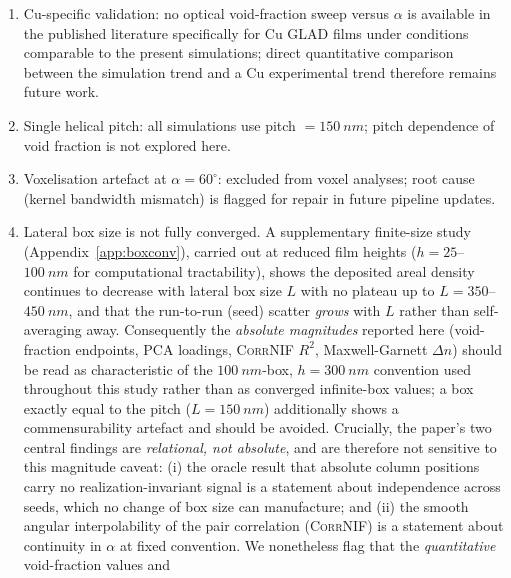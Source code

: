 \documentclass[aip,amsmath,amssymb,reprint]{revtex4-1}
\newcommand{\dang}{\ensuremath{\alpha}}
\begin{document}
\begin{enumerate}
    (An earlier watershed-estimator analysis of these same runs reported
    $\beta\approx81$--$82^{\circ}$ and a non-monotonic $\sigma$ dependence;
    as in the two preceding items, this is an artefact of that estimator on
    the dense box-$\SI{100}{nm}$ film and does not survive re-measurement.)
  \item Cu-specific validation: no optical void-fraction sweep versus $\dang$
    is available in the published literature specifically for Cu GLAD films
    under conditions comparable to the present simulations; direct quantitative
    comparison between the simulation trend and a Cu experimental trend
    therefore remains future work.
  \item Single helical pitch: all simulations use pitch $= \SI{150}{nm}$;
    pitch dependence of void fraction is not explored here.
  \item Voxelisation artefact at $\dang = 60^{\circ}$: excluded from voxel
    analyses; root cause (kernel bandwidth mismatch) is flagged for
    repair in future pipeline updates.
  \item Lateral box size is not fully converged. A supplementary finite-size
    study (Appendix~\ref{app:boxconv}), carried out at reduced film heights
    ($h = 25$--$\SI{100}{nm}$ for computational tractability), shows the
    deposited areal density continues to decrease with lateral box size $L$
    with no plateau up to $L = 350$--$\SI{450}{nm}$, and that the run-to-run
    (seed) scatter \emph{grows} with $L$ rather than self-averaging away.
    Consequently the \emph{absolute magnitudes} reported here (void-fraction
    endpoints, PCA loadings, \textsc{CorrNIF} $R^2$, Maxwell-Garnett $\Delta
    n$) should be read as characteristic of the $\SI{100}{nm}$-box,
    $h=\SI{300}{nm}$ convention used throughout this study rather than as
    converged infinite-box values; a box exactly equal to the pitch
    ($L=\SI{150}{nm}$) additionally shows a commensurability artefact and
    should be avoided. Crucially, the paper's two central findings are
    \emph{relational, not absolute}, and are therefore not sensitive to this
    magnitude caveat: (i) the oracle result that absolute column positions
    carry no realization-invariant signal is a statement about independence
    across seeds, which no change of box size can manufacture; and (ii) the
    smooth angular interpolability of the pair correlation (\textsc{CorrNIF})
    is a statement about continuity in $\dang$ at fixed convention. We
    nonetheless flag that the \emph{quantitative} void-fraction values and

\end{enumerate}
\end{document}
